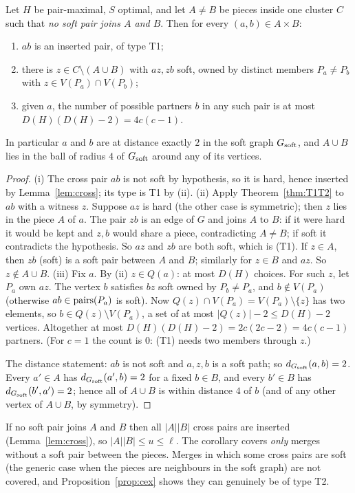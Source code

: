 \begin{corollary}\label{cor:softfree}
Let $H$ be pair-maximal, $S$ optimal, and let $A\ne B$ be pieces inside one cluster $C$ such that \emph{no soft pair joins $A$ and $B$}. Then for every $(a,b)\in A\times B$:
\begin{enumerate}
\item[(i)] $ab$ is an inserted pair, of type T1;
\item[(ii)] there is $z\in C\setminus(A\cup B)$ with $az,zb$ soft, owned by distinct members $P_a\ne P_b$ with $z\in V(P_a)\cap V(P_b)$;
\item[(iii)] given $a$, the number of possible partners $b$ in any such pair is at most $D(H)(D(H)-2)=4c(c-1)$.
\end{enumerate}
In particular $a$ and $b$ are at distance exactly $2$ in the soft graph $G_{\mathrm{soft}}$, and $A\cup B$ lies in the ball of radius $4$ of $G_{\mathrm{soft}}$ around any of its vertices.
\end{corollary}
\begin{proof}
(i) The cross pair $ab$ is not soft by hypothesis, so it is hard, hence inserted by Lemma~\ref{lem:cross}; its type is T1 by (ii). (ii) Apply Theorem~\ref{thm:T1T2} to $ab$ with a witness $z$. Suppose $az$ is hard (the other case is symmetric); then $z$ lies in the piece $A$ of $a$. The pair $zb$ is an edge of $G$ and joins $A$ to $B$: if it were hard it would be kept and $z,b$ would share a piece, contradicting $A\ne B$; if soft it contradicts the hypothesis. So $az$ and $zb$ are both soft, which is (T1). If $z\in A$, then $zb$ (soft) is a soft pair between $A$ and $B$; similarly for $z\in B$ and $az$. So $z\notin A\cup B$. (iii) Fix $a$. By (ii) $z\in Q(a)$: at most $D(H)$ choices. For such $z$, let $P_a$ own $az$. The vertex $b$ satisfies $bz$ soft owned by $P_b\ne P_a$, and $b\notin V(P_a)$ (otherwise $ab\in\mathrm{pairs}(P_a)$ is soft). Now $Q(z)\cap V(P_a)=V(P_a)\setminus\{z\}$ has two elements, so $b\in Q(z)\setminus V(P_a)$, a set of at most $|Q(z)|-2\le D(H)-2$ vertices. Altogether at most $D(H)(D(H)-2)=2c(2c-2)=4c(c-1)$ partners. (For $c=1$ the count is $0$: (T1) needs two members through $z$.)

The distance statement: $ab$ is not soft and $a,z,b$ is a soft path; so $d_{G_{\mathrm{soft}}}(a,b)=2$. Every $a'\in A$ has $d_{G_{\mathrm{soft}}}(a',b)=2$ for a fixed $b\in B$, and every $b'\in B$ has $d_{G_{\mathrm{soft}}}(b',a')=2$; hence all of $A\cup B$ is within distance $4$ of $b$ (and of any other vertex of $A\cup B$, by symmetry).
\end{proof}
\begin{remark}[Scope]\label{rem:scope}
If no soft pair joins $A$ and $B$ then all $|A||B|$ cross pairs are inserted (Lemma~\ref{lem:cross}), so $|A||B|\le u\le\ell$. The corollary covers \emph{only} merges without a soft pair between the pieces. Merges in which some cross pairs are soft (the generic case when the pieces are neighbours in the soft graph) are not covered, and Proposition~\ref{prop:cex} shows they can genuinely be of type T2.
\end{remark}


